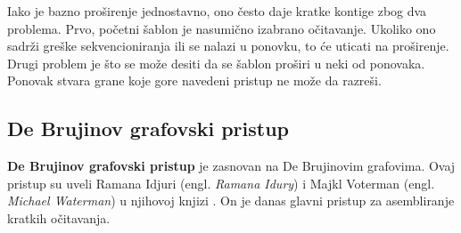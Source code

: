 \documentclass[12pt,oneside]{memoir}
\begin{document}
Iako je bazno proširenje jednostavno, ono često daje kratke kontige zbog dva problema. Prvo, početni šablon je nasumično izabrano očitavanje. Ukoliko ono sadrži greške sekvencioniranja ili se nalazi u ponovku, to će uticati na proširenje. Drugi problem je što se može desiti da se šablon proširi u neki od ponovaka. Ponovak stvara grane koje gore navedeni pristup ne može da razreši.

\begin{comment}
Da bismo rešili prvi problem, biramo očitavanje za šablon, ako je malo verovatno da ono sadrži grešku sekvenciranja ili ako je malo verovatno da će biti u ponovljenom regionu. Koristeći ideju u sekciji 5.3.1, broje se frekvencije svih k-mera svih očitavanja. Očitavanje R se bira za šablon, ako su frekvencije svih njegovih k-mera unutar nekih korisnički definisanih pragova $\theta_{min}$ i $\theta_{max}$. Ako je broj pojavljivanja nekog k-mera manji od $\theta_{min}$, R će verovatno sadržati grešku sekvenciranja. Ako je broj pojavljivanja nekog k-mera veći od $\theta_{max}$, R će se verovatno naći u ponovljenom regionu. Ova dva praga mogu biti određena proučavanjem histograma frekvencija svih k-mera ulaznih sekvenci očitavanja.

Za drugi problem, rešenje je korišćenje informacija o povezivanju paired-end očitavanja za rešavanje nasumičnosti. Ovaj pristup je korišćen od strane $PE-asemblera [9]$. Figura 5.14 ilustruje tu ideju. Pretpostavimo da možemo proširiti šablon koristeći 2 različita očitavanja (crno i sivo). Ne možemo odlučiti koje je ispravo (pogledati Figuru 5.14(a)). Kako svako očitavanje ima svog para, možemo biti u stanju da donesemo odluku. Postoje 2 slučaja. U prvom slučaju, ako parnjak crnom očitavanju može biti poravnat sa šablonom, možemo verovati crnom očitavanju (Figura 5.14(b)). U drugom slučaju, pretpostavimo  da postoji nekoliko očitavanja R koja su poravnata sa šablonom i parnjaci od R mogu biti poravnati sa panjakom crnog očitavanja (pogledati Figuru 5.14(c)). Onda možemo verovati i crnom očitavanju. Drugim rečima, informacije o povezanosti paired-end očitavanja mogu pomoći u  filtriranju onih lažno pozitivnih poravnanja.
\end{comment}

\subsection{De Brujinov grafovski pristup}
\label{odeljak:DeBrujinovGraf}

\textbf{De Brujinov grafovski pristup} je zasnovan na De Brujinovim grafovima. Ovaj pristup su uveli Ramana Idjuri (engl. \textit{Ramana Idury}) i Majkl Voterman (engl. \textit{Michael Waterman}) u njihovoj knjizi \cite{Voterman}. On je danas glavni pristup za asembliranje kratkih očitavanja.
\end{document}

